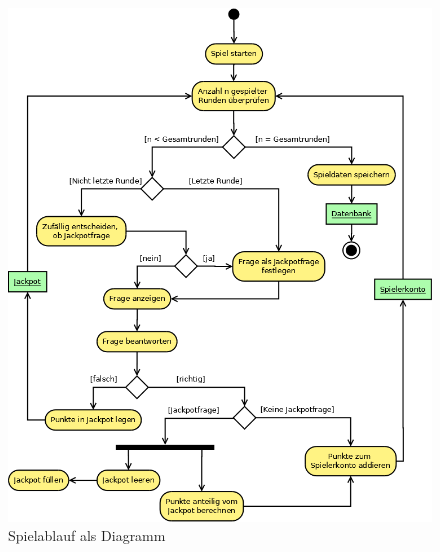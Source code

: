 \documentclass[11pt,a4paper]{scrreprt}
\begin{document}
\begin{figure}
	\centering
	\includegraphics[height=0.9\textheight]{Spielablauf_Aktivitaetsdiagramm.png}
	\caption{Spielablauf als Diagramm}
	\label{img:Spielablauf}
\end{figure}
\end{document}
